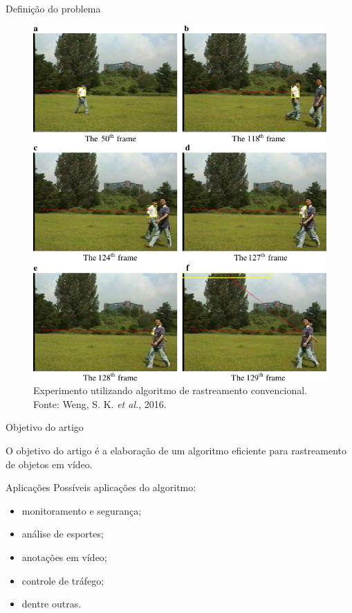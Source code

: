 \documentclass[10pt]{beamer}
\begin{document}
\begin{frame}[fragile]{Definição do problema}
  \begin{figure}[H]
  	\label{fig:conventional-alg}
  	\includegraphics[scale=0.45]{images/fig1.pdf}
  	\caption{Experimento utilizando algoritmo de rastreamento convencional. Fonte: Weng, S. K. \textit{et al.}, 2016.}
  \end{figure}
\end{frame}

\begin{frame}[fragile]{Objetivo do artigo}
	\begin{center}
		\alert{O objetivo do artigo é a elaboração de um algoritmo eficiente para rastreamento de objetos em vídeo.}
	\end{center}
\end{frame}

\begin{frame}[fragile]{Aplicações}
Possíveis aplicações do algoritmo:

\begin{itemize}
	\item monitoramento e segurança;
	\item análise de esportes;
	\item anotações em vídeo;
	\item controle de tráfego;
	\item dentre outras.
\end{itemize}
\end{frame}
\end{document}
